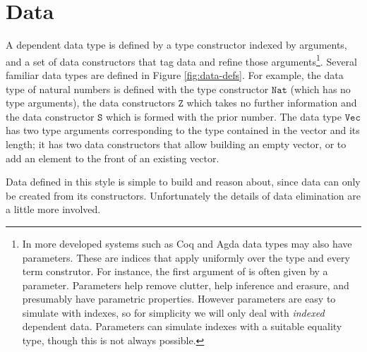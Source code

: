 \section{Data}


A dependent data type is defined by a type constructor indexed by arguments, and a set of data constructors that tag data and refine those arguments\footnote{
 In more developed systems such as Coq and Agda data types may also have parameters.
 These are indices that apply uniformly over the type and every term construtor.
 For instance, the first argument of \Vect{} is often given by a parameter.
 Parameters help remove clutter, help inference and erasure, and presumably have parametric properties\cite{10.1145/99370.99404}.
 However parameters are easy to simulate with indexes, so for simplicity we will only deal with \emph{indexed} dependent data.
 Parameters can simulate indexes with a suitable equality type\cite{sjoberg2012irrelevance}, though this is not always possible\cite[Section 8]{bertrand:hal-02896776}.
}.
Several familiar data types are defined in Figure \ref{fig:data-defs}.
For example, the data type of natural numbers is defined with the type constructor $\mathtt{Nat}$ (which has no type arguments), the data constructors $\mathtt{Z}$ which takes no further information and the data constructor $\mathtt{S}$ which is formed with the prior number.
The data type $\mathtt{Vec}$ has two type arguments corresponding to the type contained in the vector and its length; it has two data constructors that allow building an empty vector, or to add an element to the front of an existing vector.

Data defined in this style is simple to build and reason about, since data can only be created from its constructors.
Unfortunately the details of data elimination are a little more involved.

